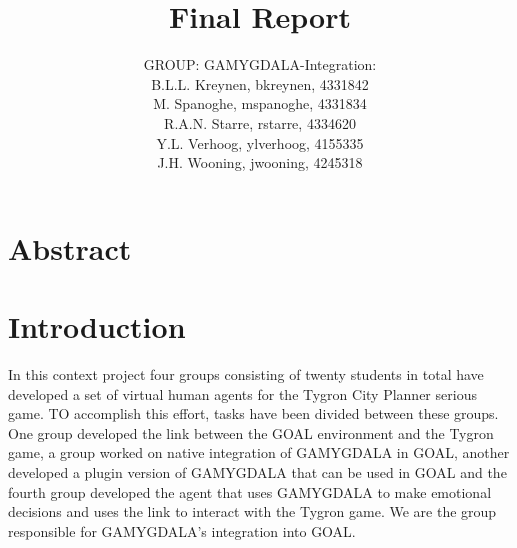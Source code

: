 \documentclass[11pt]{article}
\title{Final Report}
\author{GROUP: GAMYGDALA-Integration:\\
	B.L.L. Kreynen, bkreynen, 4331842\\
	M. Spanoghe, mspanoghe, 4331834\\
	R.A.N. Starre, rstarre, 4334620\\
	Y.L. Verhoog, ylverhoog, 4155335\\
	J.H. Wooning, jwooning, 4245318\\
}
\begin{document}
\maketitle
\pagebreak
\tableofcontents
\pagebreak
\section{Abstract}

\clearpage

\section{Introduction}
In this context project four groups consisting of twenty students in total have developed a set of virtual human agents for the Tygron City Planner serious game. TO accomplish this effort, tasks have been divided between these groups. One group developed the link between the GOAL\cite{GOAL} environment and the Tygron game, a group worked on native integration of \gls{GAMYGDALA}\cite{GAMYGDALA} in GOAL, another developed a plugin version of GAMYGDALA that can be used in GOAL and the fourth group developed the agent that uses GAMYGDALA to make emotional decisions and uses the link to interact with the Tygron game. We are the group responsible for GAMYGDALA's integration into GOAL. 
\end{document}
